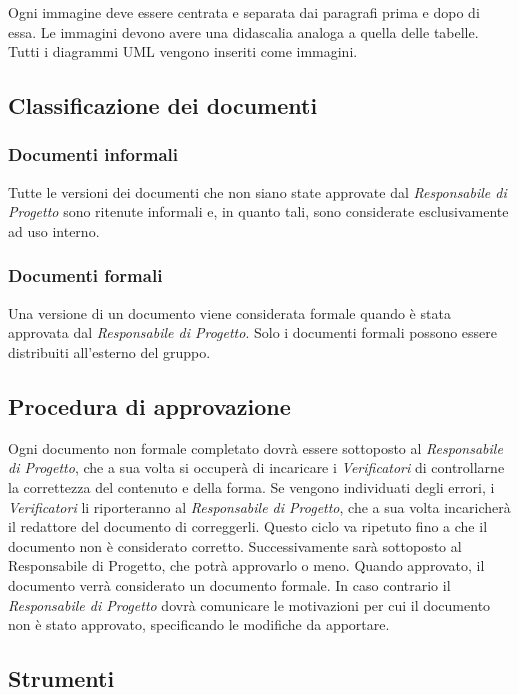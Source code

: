 \documentclass[NormediProgetto.tex]{subfiles}
\begin{document}
Ogni immagine deve essere centrata e separata dai paragrafi prima e dopo di essa. Le immagini devono avere una didascalia analoga a quella delle tabelle. Tutti i diagrammi UML vengono inseriti come immagini.

\subsection{Classificazione dei documenti}

\subsubsection{Documenti informali}

Tutte le versioni dei documenti che non siano state approvate dal \textit{Responsabile di Progetto} sono ritenute informali e, in quanto tali, sono considerate esclusivamente ad uso interno.

\subsubsection{Documenti formali}

Una versione di un documento viene considerata formale quando è stata approvata dal \textit{Responsabile di Progetto}. Solo i documenti formali possono essere distribuiti all’esterno del gruppo. 

\subsection{Procedura di approvazione}

Ogni documento non formale completato dovrà essere sottoposto al \textit{Responsabile di Progetto}, che a sua volta si occuperà di incaricare i \textit{Verificatori} di controllarne la correttezza del contenuto e della forma. Se vengono individuati degli errori, i \textit{Verificatori} li riporteranno al \textit{Responsabile di Progetto}, che a sua volta incaricherà il redattore del documento di correggerli. Questo ciclo va ripetuto fino a che il documento non è considerato corretto. Successivamente sarà sottoposto al Responsabile di Progetto, che potrà approvarlo o meno. Quando approvato, il documento verrà considerato un documento formale. In caso contrario il \textit{Responsabile di Progetto} dovrà comunicare le motivazioni per cui il documento non è stato approvato, specificando le modifiche da apportare.

\subsection{Strumenti}
\end{document}
